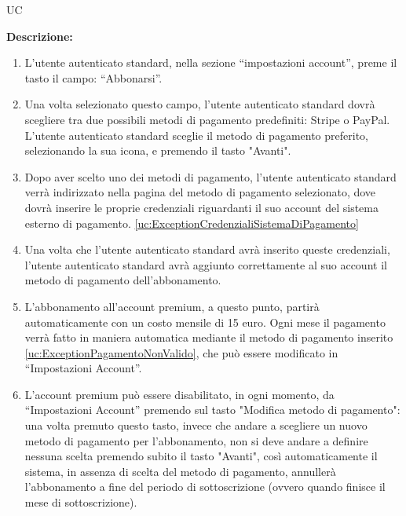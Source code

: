 \begin{listaPersonale}{UC}
\begin{listaPersonale2}[UC] {}
        \textbf{Descrizione:}
        \begin{enumerate}
            \item L'utente autenticato standard, nella sezione “impostazioni account”, preme il tasto il campo: “Abbonarsi”.
            \item Una volta selezionato questo campo, l'utente autenticato standard dovrà scegliere tra due possibili metodi di pagamento predefiniti: Stripe o PayPal. L'utente autenticato standard sceglie il metodo di pagamento preferito, selezionando la sua icona, e premendo il tasto "Avanti".
            \item Dopo aver scelto uno dei metodi di pagamento, l'utente autenticato standard verrà indirizzato nella pagina del metodo di pagamento selezionato, dove dovrà inserire le proprie credenziali riguardanti il suo account del sistema esterno di pagamento. \ref{uc:ExceptionCredenzialiSistemaDiPagamento}
            \item Una volta che l'utente autenticato standard avrà inserito queste credenziali, l'utente autenticato standard avrà aggiunto correttamente al suo account il metodo di pagamento dell'abbonamento.
            \item L'abbonamento all'account premium, a questo punto, partirà automaticamente con un costo mensile di 15 euro. Ogni mese il pagamento verrà fatto in maniera automatica mediante il metodo di pagamento inserito \ref{uc:ExceptionPagamentoNonValido}, che può essere modificato in “Impostazioni Account”.
            \item L'account premium può essere disabilitato, in ogni momento, da “Impostazioni Account” premendo sul tasto "Modifica metodo di pagamento": una volta premuto questo tasto, invece che andare a scegliere un nuovo metodo di pagamento per l'abbonamento, non si deve andare a definire nessuna scelta premendo subito il tasto "Avanti", così automaticamente il sistema, in assenza di scelta del metodo di pagamento, annullerà l'abbonamento a fine del periodo di sottoscrizione (ovvero quando finisce il mese di sottoscrizione).
        \end{enumerate}

        \begin{comment}
        \todo{Forse dovremmo fare un requisito funzionale per disabilitare account premium?! Si dovremmo metterlo, ma a quel punto dovremmo fare anche un use case + descrizione}
        \end{comment}


\end{listaPersonale2}
\end{listaPersonale}
